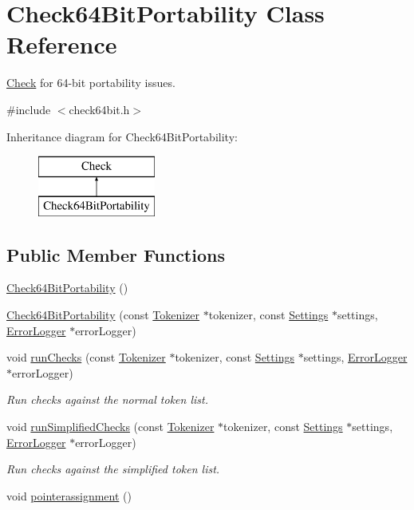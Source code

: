 \hypertarget{class_check64_bit_portability}{\section{Check64\-Bit\-Portability Class Reference}
\label{class_check64_bit_portability}
}


\hyperlink{class_check}{Check} for 64-\/bit portability issues.  




{\ttfamily \#include $<$check64bit.\-h$>$}

Inheritance diagram for Check64\-Bit\-Portability\-:\begin{figure}[H]
\begin{center}
\leavevmode
\includegraphics[height=2.000000cm]{class_check64_bit_portability}
\end{center}
\end{figure}
\subsection*{Public Member Functions}
\begin{DoxyCompactItemize}
\item 
\hyperlink{class_check64_bit_portability_a47f659092b84fc921b591fa9ddd43195}{Check64\-Bit\-Portability} ()
\item 
\hyperlink{class_check64_bit_portability_ac8e7032372220664d7a0c45b472b6d43}{Check64\-Bit\-Portability} (const \hyperlink{class_tokenizer}{Tokenizer} $\ast$tokenizer, const \hyperlink{class_settings}{Settings} $\ast$settings, \hyperlink{class_error_logger}{Error\-Logger} $\ast$error\-Logger)
\item 
void \hyperlink{class_check64_bit_portability_afeba8f09831fe12519e4d28b1dac4033}{run\-Checks} (const \hyperlink{class_tokenizer}{Tokenizer} $\ast$tokenizer, const \hyperlink{class_settings}{Settings} $\ast$settings, \hyperlink{class_error_logger}{Error\-Logger} $\ast$error\-Logger)
\begin{DoxyCompactList}\small\item\em Run checks against the normal token list. \end{DoxyCompactList}\item 
void \hyperlink{class_check64_bit_portability_ad2be16d27d188adbad671c6f27307e63}{run\-Simplified\-Checks} (const \hyperlink{class_tokenizer}{Tokenizer} $\ast$tokenizer, const \hyperlink{class_settings}{Settings} $\ast$settings, \hyperlink{class_error_logger}{Error\-Logger} $\ast$error\-Logger)
\begin{DoxyCompactList}\small\item\em Run checks against the simplified token list. \end{DoxyCompactList}\item 
void \hyperlink{class_check64_bit_portability_ada478f573f7c7ceb66569c572e5b26d5}{pointerassignment} ()
\end{DoxyCompactItemize}
